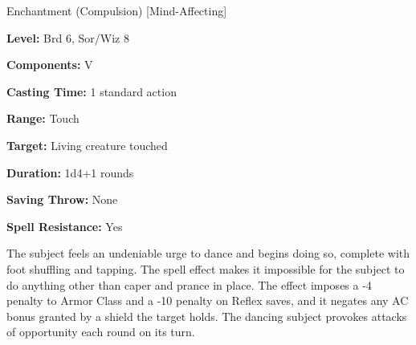 
Enchantment (Compulsion) [Mind-Affecting]

\textbf{Level:} Brd 6, Sor/Wiz 8

\textbf{Components:} V

\textbf{Casting Time:} 1 standard action

\textbf{Range:} Touch

\textbf{Target:} Living creature touched

\textbf{Duration:} 1d4+1 rounds

\textbf{Saving Throw:} None

\textbf{Spell Resistance:} Yes

The subject feels an undeniable urge to dance and begins doing so, complete with 
foot shuffling and tapping. The spell effect makes it impossible for the subject 
to do anything other than caper and prance in place. The effect imposes a -4 penalty 
to Armor Class and a -10 penalty on Reflex saves, and it negates any AC bonus granted 
by a shield the target holds. The dancing subject provokes attacks of opportunity 
each round on its turn.

